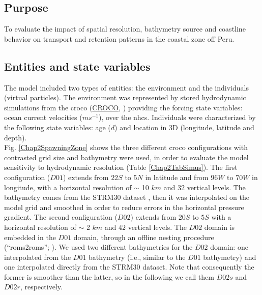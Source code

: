 \subsection{Purpose}\label{Chap2MethPurp}

To evaluate the impact of spatial resolution, bathymetry source and coastline behavior on transport and retention patterns in the coastal zone off Peru.\\

\subsection{Entities and state variables}\label{Chap2MethEnti}

The model included two types of entities: the environment and the individuals (virtual particles). The environment was represented by stored hydrodynamic simulations from the \acrlong{croco} (\href{https://www.croco-ocean.org/}{CROCO}, \cite{HiltAucl2020,ShchMcwi2005}) providing the forcing state variables: ocean current velocities ($ms^{-1}$), over the \acrshort{nhcs}. Individuals were characterized by the following state variables: age ($d$) and location in 3D (longitude, latitude and depth).\\

Fig. \ref{Chap2SpawningZone} shows the three different \acrshort{croco} configurations with contrasted grid size and bathymetry were used, in order to evaluate the model sensitivity to hydrodynamic resolution (Table \ref{Chap2TabSimus}). The first configuration ($D01$) extends from $22$\textdegree $S$ to $5$\textdegree $N$ in latitude and from $96$\textdegree $W$ to $70$\textdegree $W$ in longitude, with a horizontal resolution of $\sim$ 10 $km$ and $32$ vertical levels. The bathymetry comes from the STRM30 dataset \citep{BeckSand2009}, then it was interpolated on the model grid and smoothed in order to reduce errors in the horizontal pressure gradient. The second configuration ($D02$) extends from $20$\textdegree $S$ to $5$\textdegree $S$ with a horizontal resolution of $\sim$ 2 $km$ and $42$ vertical levels. The $D02$ domain is embedded in the $D01$ domain, through an offline nesting procedure (``roms2roms''; \cite{MasoMole2010}). We used two different bathymetries for the $D02$ domain: one interpolated from the $D01$ bathymetry (i.e., similar to the $D01$ bathymetry) and one interpolated directly from the STRM30 dataset. Note that consequently the former is smoother than the latter, so in the following we call them $D02s$ and $D02r$, respectively.\\

